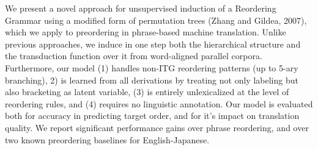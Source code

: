 We present a novel approach for unsupervised induction of a Reordering Grammar using a modified form of permutation trees (Zhang and Gildea, 2007), which we apply to preordering in phrase-based machine translation. Unlike previous approaches, we induce in one step both the hierarchical structure and the transduction function over it from word-aligned parallel corpora. Furthermore, our model (1) handles non-ITG reordering patterns (up to 5-ary branching), 2) is learned from all derivations by treating not only labeling but also bracketing as latent variable, (3) is entirely unlexicalized at the level of reordering rules, and (4) requires no linguistic annotation. Our model is evaluated both for accuracy in predicting target order, and for it's impact on translation quality. We report significant performance gains over phrase reordering, and over two known preordering baselines for English-Japanese.
